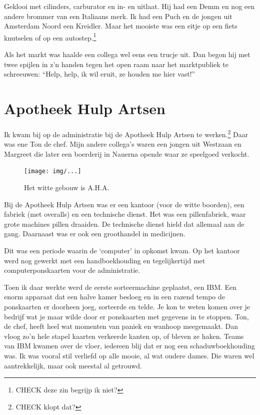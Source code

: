 \documentclass[12pt,twoside, openright]{memoir}
\begin{document}
Geklooi met cilinders, carburator en in- en uitlaat. Hij had een Demm en nog een andere brommer van een Italiaans merk. Ik had een Puch en de jongen uit Amsterdam Noord een Kreidler. Maar het mooiste was een eitje op een fiets knutselen of op een autostep.\footnote{CHECK deze zin begrijp ik niet?}

Als het markt was haalde een collega wel eens een trucje uit.  Dan begon hij met twee spijlen in z'n handen tegen het open raam naar het marktpubliek te schreeuwen: ``Help, help, ik wil eruit, ze houden me hier vast!''

\chapter{Apotheek Hulp Artsen} %
\label{cha:apotheek}

Ik kwam bij op de administratie bij de Apotheek Hulp Artsen te werken.\footnote{CHECK klopt dat?} Daar was ene Ton de chef. Mijn andere collega's waren een jongen uit Westzaan en Margreet die later een boerderij in Nauerna opende waar ze speelgoed verkocht. 

\begin{figure}[t]
\texttt{[image: img/...]}
\caption{Het witte gebouw is A.H.A.}
\end{figure}

Bij de Apotheek Hulp Artsen was er een kantoor (voor de witte boorden), een fabriek (met overalls) en een technische dienst. Het was een pillenfabriek, waar grote machines pillen draaiden. De technische dienst hield dat allemaal aan de gang. Daarnaast was er ook een groothandel in medicijnen. 

Dit was een periode waarin de `computer' in opkomst kwam. Op het kantoor werd nog gewerkt met een handboekhouding en tegelijkertijd met computerponskaarten voor de administratie. 

Toen ik daar werkte werd de eerste sorteermachine geplaatst, een IBM. Een enorm apparaat dat een halve kamer besloeg en in een razend tempo de ponskaarten er doorheen joeg, sorteerde en telde. Je kon te weten komen over je bedrijf wat je maar wilde  door er ponskaarten met gegevens in te stoppen. Ton, de chef, heeft heel wat momenten van paniek en wanhoop meegemaakt. Dan vloog zo’n hele stapel kaarten verkeerde kanten op, of bleven ze haken. Teams van IBM kwamen over de vloer, iedereen blij dat er nog een schaduwboekhouding was. Ik was vooral stil verliefd op alle mooie, al wat oudere dames. Die waren wel aantrekkelijk, maar ook meestal al getrouwd. 
\end{document}
